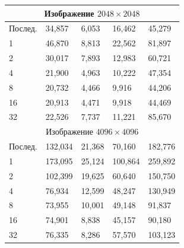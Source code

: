 \begin{longtable}{|p{23mm}|p{29mm}|p{26mm}|p{26mm}|p{26mm}|}
\multicolumn{5}{|c|}{Изображение $2048 \times 2048$}\\\hline
Послед. & 34,857 & 6,053 & 16,462 & 45,279 \\\hline
1 & 46,870 & 8,813 & 22,562 & 81,897 \\\hline
2 & 30,017 & 7,893 & 12,983 & 60,721 \\\hline
4 & 21,900 & 4,963 & 10,222 & 47,354 \\\hline
8 & 20,732 & 4,466 & 9,916 & 44,206 \\\hline
16 & 20,913 & 4,471 & 9,918 & 44,469 \\\hline
32 & 22,526 & 7,737 & 11,221 & 85,670 \\\hline
\multicolumn{5}{|c|}{Изображение $4096 \times 4096$}\\\hline
Послед. & 132,034 & 21,368 & 70,160 & 182,776 \\\hline
1 & 173,095 & 25,124 & 100,864 & 259,892 \\\hline
2 & 102,399 & 19,625 & 60,640 & 150,750 \\\hline
4 & 76,934 & 12,599 & 48,247 & 130,949 \\\hline
8 & 73,955 & 10,001 & 49,148 & 91,837 \\\hline
16 & 74,901 & 8,838 & 45,157 & 90,180 \\\hline
32 & 76,335 & 8,286 & 57,570 & 103,123 \\\hline
\end{longtable}